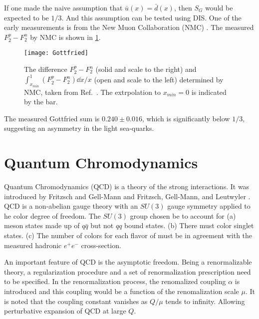 \documentclass[../main.tex]{subfiles}
\begin{document}
If one made the naive assumption that $\bar{u}\left(x\right)= \bar{d}\left(x\right)$,
then $S_G$ would be expected to be $1/3$. And this assumption can be tested using DIS.
One of the early measurements is from the New Muon Collaboration (NMC) \cite{amaudruz1991}.
The measured $F_2^p-F_2^n$ by NMC is shown in \cref{fig:NMC_Gottfried}.
\begin{figure}[htbp!]
	\centering
	\texttt{[image: Gottfried]}
	\caption{The difference $F_2^p -F_2^n$ (solid and scale to the right) and
		$\int_{x_{min}}^1 (F_2^p-F_2^n)\dd{x}/x$ (open and scale to the left)
		determined by NMC, taken from Ref.~\cite{amaudruz1991}. The extrpolation
		to $x_{min}=0$ is indicated by the bar.}
	\label{fig:NMC_Gottfried}
\end{figure}
The measured Gottfried sum is $0.240 \pm 0.016$, which is significantly below
$1/3$, suggesting an asymmetry in the light sea-quarks.

\section{Quantum Chromodynamics}
\label{sec:QCD}
Quantum Chromodynamics (QCD) is a theory of the strong interactions. It was
introduced by Fritzsch and Gell-Mann \cite{fritzsch1972} and Fritzsch, Gell-Mann,
and Leutwyler \cite{fritzsch1973}. QCD is a non-abelian gauge theory with an
$SU(3)$ gauge symmetry applied to he color degree of freedom. The $SU(3)$ group
chosen be to account for (a) meson states made up of $q\bar{q}$ but not $qq$ bound states.
(b) There must color singlet states. (c) The number of colors for each flavor of
must be in agreement with the measured hadronic $e^+ e^-$ cross-section.


An important feature of QCD is the asymptotic freedom. Being a renormalizable
theory, a regularization procedure and a set of renormalization prescription
need to be specified. In the renormalization process, the renomalized coupling $\alpha$
is introduced and this coupling would be a function of the renomalization scale $\mu$.
It is noted that the coupling constant vanishes as $Q/\mu$ tends to infinity.
Allowing perturbative expansion of QCD at large $Q$.
\end{document}
